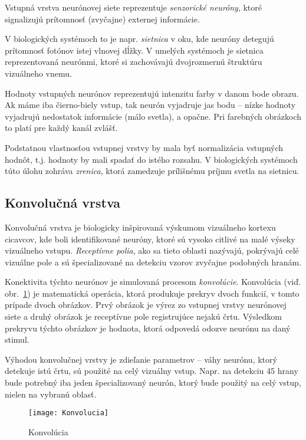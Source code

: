 Vstupná vrstva neurónovej siete reprezentuje \emph{senzorické neuróny}, ktoré signalizujú prítomnosť (zvyčajne) externej informácie.

V biologických systémoch to je napr. \emph{sietnica} v oku, kde neuróny detegujú prítomnosť fotónov istej vlnovej dĺžky. V umelých systémoch je sietnica reprezentovaná neurónmi, ktoré si zachovávajú dvojrozmernú štruktúru vizuálneho vnemu.

Hodnoty vstupných neurónov reprezentujú intenzitu farby v danom bode obrazu. Ak máme iba čierno-biely vstup, tak neurón vyjadruje jas bodu -- nízke hodnoty vyjadrujú nedostatok informácie (málo svetla), a opačne. Pri farebných obrázkoch to platí pre každý kanál zvlášť.

Podstatnou vlastnosťou vstupnej vrstvy by mala byť normalizácia vstupných hodnôt, t.j. hodnoty by mali spadať do istého rozsahu. V biologických systémoch túto úlohu zohráva \emph{zrenica}, ktorá zamedzuje prílišnému príjmu svetla na sietnicu.

\subsection{Konvolučná vrstva}

Konvolučná vrstva\autocite{LeCunn1998} je biologicky inšpirovaná výskumom vizuálneho kortexu cicavcov, kde boli identifikované neuróny, ktoré sú vysoko citlivé na malé výseky vizuálneho vstupu. \emph{Receptívne polia}, ako sa tieto oblasti nazývajú, pokrývajú celé vizuálne pole a sú špecializované na detekciu vzorov zvyčajne podobných hranám.\autocite{Hubel1968}

Konektivita týchto neurónov je simulovaná procesom \emph{konvolúcie}. Konvolúcia (viď. obr.~\ref{fig:Konvolucia}) je matematická operácia, ktorá produkuje prekryv dvoch funkcií, v tomto prípade dvoch obrázkov. Prvý obrázok je výrez zo vstupnej vrstvy neurónovej siete a druhý obrázok je receptívne pole registrujúce nejakú črtu. Výsledkom prekryvu týchto obrázkov je hodnota, ktorá odpovedá odozve neurónu na daný stimul.

Výhodou konvolučnej vrstvy je zdieľanie parametrov -- váhy neurónu, ktorý detekuje istú črtu, sú použité na celý vizuálny vstup. Napr. na detekciu 45\degree{} hrany bude potrebný iba jeden špecializovaný neurón, ktorý bude použitý na celý vstup, nielen na vybranú oblasť.

\begin{figure}
  \centering
  \texttt{[image: Konvolucia]}
  \caption{Konvolúcia}
  \label{fig:Konvolucia}
\end{figure}

